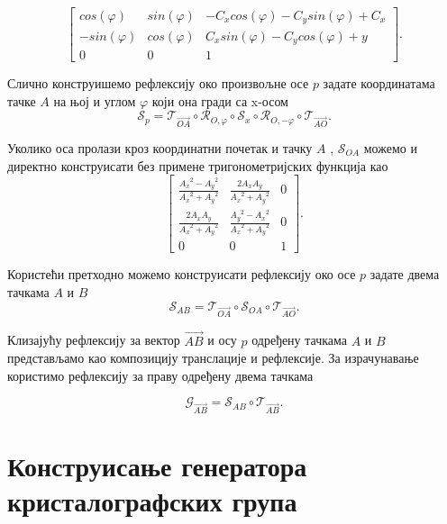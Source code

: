 \documentclass[12pt]{report}
\begin{document}
\[\begin{bmatrix}cos(\varphi) & sin(\varphi) & -C_x cos(\varphi) - C_y sin(\varphi) + C_x\\ -sin(\varphi) & cos(\varphi)&C_x sin(\varphi) - C_y cos(\varphi) +y\\ 0 & 0 & 1\end{bmatrix}.\]

Слично конструишемо рефлексију око произвољне осе $p$ задате координатама тачке $A$ на њој и углом $\varphi$ који она гради са x-осом
$$\mathcal{S}_{p} = \mathcal{T}_{\vec{OA}} \circ \mathcal{R}_{O,\varphi} \circ \mathcal{S}_{x} \circ \mathcal{R}_{O,-\varphi} \circ \mathcal{T}_{\vec{AO}}.$$

Уколико оса пролази кроз координатни почетак и тачку $A$ , $\mathcal{S}_{OA}$ можемо и директно конструисати без примене тригонометријских функција као
\[\begin{bmatrix} \frac{{A_x}^2-{A_y}^2}{{A_x}^2+{A_y}^2} & \frac{2A_x A_y}{{A_x}^2+{A_y}^2} & 0\\ \frac{2A_x A_y}{{A_x}^2+{A_y}^2} & \frac{{A_y}^2-{A_x}^2}{{A_x}^2+{A_y}^2}&0 \\ 0 & 0 & 1\end{bmatrix}.\]

Користећи претходно можемо конструисати рефлексију око осе $p$ задате двема тачкама $A$ и $B$
$$ \mathcal{S}_{AB}   = \mathcal{T}_{\vec{OA}} \circ \mathcal{S}_{OA} \circ \mathcal{T}_{\vec{AO}} . $$

Клизајућу рефлексију за вектор $\vec{AB}$ и осу $p$ одређену тачкама $A$ и $B$ представљамо као композицију транслације и рефлексије. За израчунавање користимо рефлексију за праву одређену двема тачкама

$$ \mathcal{G}_{\vec{AB}} = \mathcal{S}_{AB} \circ \mathcal{T}_{\vec{AB}}.$$



\section{Конструисање генератора кристалографских група}



\end{document}
